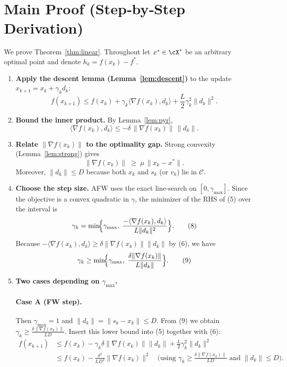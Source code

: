 \documentclass{article}
\newcommand{\cC}{\mathcal{C}}
\newcommand{\inner}[2]{\langle #1,#2\rangle}
\begin{document}
\section*{Main Proof (Step‑by‑Step Derivation)}

We prove Theorem~\ref{thm:linear}. Throughout let $x^{*}\in\cX^{*}$ be an arbitrary optimal point and denote $h_{k}=f(x_{k})-f^{*}$.

\begin{enumerate}
\item[Step 1.] \textbf{Apply the descent lemma (Lemma~\ref{lem:descent})} to the update $x_{k+1}=x_{k}+\gamma_{k}d_{k}$:
\[
f(x_{k+1}) \le f(x_{k}) + \gamma_{k}\inner{\nabla f(x_{k})}{d_{k}} + \frac{L}{2}\gamma_{k}^{2}\|d_{k}\|^{2}.
\tag{5}
\]

\item[Step 2.] \textbf{Bound the inner product.} By Lemma~\ref{lem:pyr},
\[
\inner{\nabla f(x_{k})}{d_{k}} \le -\delta\,\|\nabla f(x_{k})\|\,\|d_{k}\|.
\tag{6}
\]

\item[Step 3.] \textbf{Relate $\|\nabla f(x_{k})\|$ to the optimality gap.}
Strong convexity (Lemma~\ref{lem:strong}) gives
\[
\|\nabla f(x_{k})\| \;\ge\; \mu\,\|x_{k}-x^{*}\|.
\tag{7}
\]
Moreover, $\|d_{k}\|\le D$ because both $x_{k}$ and $s_{k}$ (or $v_{k}$) lie in $\cC$.

\item[Step 4.] \textbf{Choose the step size.}
AFW uses the exact line‑search on $[0,\gamma_{\max}]$. Since the objective is a convex quadratic in $\gamma$, the minimizer of the RHS of (5) over the interval is
\[
\gamma_{k}= \min\!\Bigl\{\gamma_{\max},\; \frac{-\inner{\nabla f(x_{k})}{d_{k}}}{L\|d_{k}\|^{2}}\Bigr\}.
\tag{8}
\]
Because $-\inner{\nabla f(x_{k})}{d_{k}}\ge\delta\|\nabla f(x_{k})\|\|d_{k}\|$ by (6), we have
\[
\gamma_{k}\ge \min\!\Bigl\{\gamma_{\max},\; \frac{\delta\|\nabla f(x_{k})\|}{L\|d_{k}\|}\Bigr\}.
\tag{9}
\]

\item[Step 5.] \textbf{Two cases depending on $\gamma_{\max}$.}

\paragraph{Case A (FW step).} Then $\gamma_{\max}=1$ and $\|d_{k}\|= \|s_{k}-x_{k}\|\le D$.
From (9) we obtain $\gamma_{k}\ge \frac{\delta\|\nabla f(x_{k})\|}{L D}$.
Insert this lower bound into (5) together with (6):
\[
\begin{aligned}
f(x_{k+1}) &\le f(x_{k}) -\gamma_{k}\delta\|\nabla f(x_{k})\|\|d_{k}\|
+ \frac{L}{2}\gamma_{k}^{2}\|d_{k}\|^{2}\\[4pt]
&\le f(x_{k}) -\frac{\delta^{2}}{L D^{2}}\|\nabla f(x_{k})\|^{2}
\quad\text{(using $\gamma_{k}\ge\frac{\delta\|\nabla f(x_{k})\|}{L D}$ and $\|d_{k}\|\le D$)}.
\end{aligned}
\tag{10}
\]


\end{enumerate}
\end{document}
